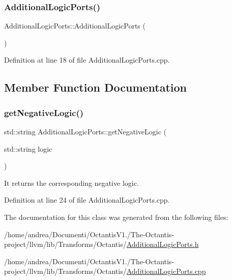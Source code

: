 \subsubsection{\texorpdfstring{Additional\+Logic\+Ports()}{AdditionalLogicPorts()}}
{\footnotesize\ttfamily Additional\+Logic\+Ports\+::\+Additional\+Logic\+Ports (\begin{DoxyParamCaption}{ }\end{DoxyParamCaption})}



Definition at line 18 of file Additional\+Logic\+Ports.\+cpp.



\subsection{Member Function Documentation}
\mbox{\label{classoctantis_1_1AdditionalLogicPorts_a375d3e65187034c5c2fdf80bf22d49d7}} 
\subsubsection{\texorpdfstring{get\+Negative\+Logic()}{getNegativeLogic()}}
{\footnotesize\ttfamily std\+::string Additional\+Logic\+Ports\+::get\+Negative\+Logic (\begin{DoxyParamCaption}\item[{std\+::string}]{logic }\end{DoxyParamCaption})}



It returns the corresponding negative logic. 



Definition at line 24 of file Additional\+Logic\+Ports.\+cpp.



The documentation for this class was generated from the following files\+:\begin{DoxyCompactItemize}
\item 
/home/andrea/\+Documenti/\+Octantis\+V1./\+The-\/\+Octantis-\/project/llvm/lib/\+Transforms/\+Octantis/\hyperlink{AdditionalLogicPorts_8h}{Additional\+Logic\+Ports.\+h}\item 
/home/andrea/\+Documenti/\+Octantis\+V1./\+The-\/\+Octantis-\/project/llvm/lib/\+Transforms/\+Octantis/\hyperlink{AdditionalLogicPorts_8cpp}{Additional\+Logic\+Ports.\+cpp}\end{DoxyCompactItemize}
